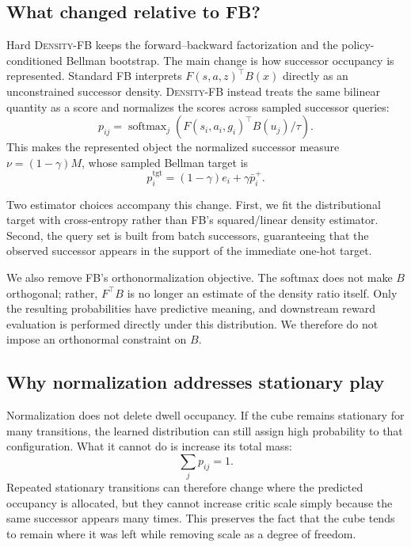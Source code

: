 \documentclass{article}
\newcommand{\DensityFB}{\textsc{Density-FB}}
\begin{document}
\subsection{What changed relative to FB?}

Hard \DensityFB{} keeps the forward--backward factorization and the policy-conditioned Bellman bootstrap.
The main change is how successor occupancy is represented.
Standard FB interprets $F(s,a,z)^\top B(x)$ directly as an unconstrained successor density.
\DensityFB{} instead treats the same bilinear quantity as a score and normalizes the scores across sampled successor queries:
\begin{equation}
    p_{ij} = \operatorname{softmax}_j \left( F(s_i,a_i,g_i)^\top B(u_j)/\tau \right).
\end{equation}
This makes the represented object the normalized successor measure $\nu=(1-\gamma)M$, whose sampled Bellman target is 
\begin{equation}
p_i^{\mathrm{tgt}} = (1-\gamma)e_i+\gamma\bar p_i^+.
\end{equation}

Two estimator choices accompany this change.
First, we fit the distributional target with cross-entropy rather than FB's squared/linear density estimator.
Second, the query set is built from batch successors, guaranteeing that the observed successor appears in the support of the immediate one-hot target.

We also remove FB's orthonormalization objective.
The softmax does not make $B$ orthogonal; rather, $F^\top B$ is no longer an estimate of the density ratio itself.
Only the resulting probabilities have predictive meaning, and downstream reward evaluation is performed directly under this distribution.
We therefore do not impose an orthonormal constraint on $B$.

\subsection{Why normalization addresses stationary play}

Normalization does not delete dwell occupancy.
If the cube remains stationary for many transitions, the learned distribution can still assign high probability to that configuration.
What it cannot do is increase its total mass:
\begin{equation}
    \sum_j p_{ij}=1.
\end{equation}
Repeated stationary transitions can therefore change where the predicted occupancy is allocated, but they cannot increase critic scale simply because the same successor appears many times.
This preserves the fact that the cube tends to remain where it was left while removing scale as a degree of freedom.
\end{document}

